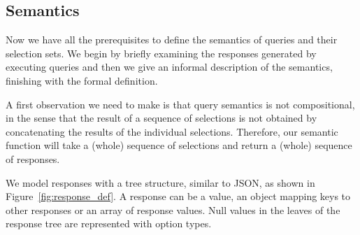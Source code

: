 






\subsection{Semantics}\label{subsec:semantics}
Now we have all the prerequisites to define the semantics of \gql queries and their selection sets. We begin by briefly examining the responses generated by executing queries and then we give an informal description of the semantics, finishing with the formal definition. %

A first observation we need to make is that query semantics is not compositional, in the sense that the result of a sequence of selections is not obtained by concatenating the results of the individual selections. Therefore, our semantic function will take a (whole) sequence of selections and return a (whole) sequence of responses.  

We model responses with a tree structure, similar to JSON, as shown in Figure~\ref{fig:response_def}. A response can be a value, an object mapping keys to other responses or an array of response values. Null values in the leaves of the response tree are represented with option types.%


